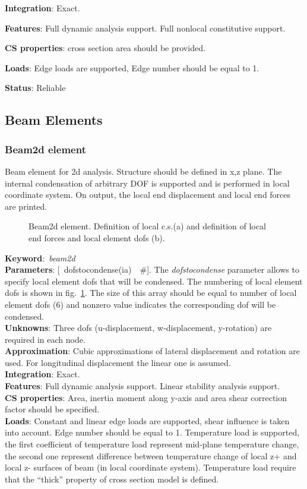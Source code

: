 \documentclass[12pt,dvips]{article}
\newcommand{\descitem}[1]{{\noindent \bf #1}:}
\newcommand{\elemkeyword}[1]{\descitem{Keyword}~{\em #1}}
\newcommand{\elemparam}[2]{{{#1\tiny (#2)}~~\#}}
\newcommand{\optelemparam}[2]{{[~\elemparam{#1}{#2}]}}
\newcommand{\param}[1]{{\it #1}}
\begin{document}
\descitem{Integration} Exact.

\descitem{Features} Full dynamic analysis support. Full nonlocal
constitutive support.

\descitem{CS properties} cross section area should be
provided.

\descitem{Loads} Edge loads are supported, Edge number should be equal
to 1.

\descitem{Status} Reliable

\subsection{Beam Elements}
\subsubsection{Beam2d element}
Beam element for 2d analysis. Structure should be defined in x,z
plane. The internal condensation
of arbitrary DOF is supported and is performed in local coordinate
system. On output, the local end displacement and local end forces are
printed. 

\begin{figure}[tb]
\begin{center}\end{center}
\caption{Beam2d element. Definition of local c.s.(a)  and definition of
local end forces and local element dofs (b).}
\label{beam2dfig}
\end{figure}

\elemkeyword{beam2d}\\
\descitem{Parameters} \optelemparam{dofstocondense}{ia}. The
\param{dofstocondense} parameter allows to specify local element dofs that
will be condensed. The numbering of local element dofs is shown in
fig.~\ref{beam2dfig}. The size of this array should be equal to
number of local element dofs (6) and nonzero value indicates the
corresponding dof will be condensed.\\
\descitem{Unknowns}
Three dofs (u-displacement, w-displacement, y-rotation) are required
in each node.\\
\descitem{Approximation} Cubic  approximations of lateral displacement and
rotation are used. For longitudinal displacement the linear one is
assumed.\\
\descitem{Integration} Exact.\\
\descitem{Features} Full dynamic analysis support. Linear stability
analysis support.\\
\descitem{CS properties} Area,
inertia moment along y-axis and area shear correction factor should be specified.\\ 
\descitem{Loads}  Constant and linear edge loads are supported, shear
influence is taken into account. 
Edge number should be equal to 1. Temperature load is
supported, the first coefficient of temperature load represent
mid-plane temperature change, the second one represent difference
between temperature change of local z+ and local z- surfaces of beam (in local coordinate
system). Temperature load require that the ``thick'' property of cross
section model is defined.
\end{document}
